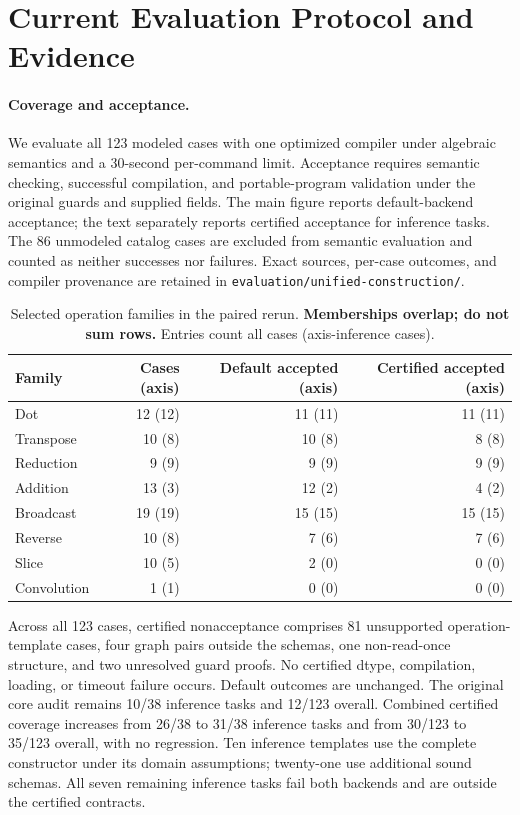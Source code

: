 \section{Current Evaluation Protocol and Evidence}
\label{app:current-evaluation}
\paragraph{Coverage and acceptance.}
We evaluate all 123 modeled cases with one optimized compiler under
algebraic semantics and a 30-second per-command limit. Acceptance requires
semantic checking, successful compilation, and portable-program validation
under the original guards and supplied fields. The main figure reports
default-backend acceptance; the text separately reports certified acceptance
for inference tasks. The 86 unmodeled catalog cases are excluded from
semantic evaluation and counted as neither successes nor failures.
Exact sources, per-case outcomes, and compiler provenance are retained in
\nolinkurl{evaluation/unified-construction/}.

\begin{table}[!htbp]
\caption{Selected operation families in the paired rerun.
\textbf{Memberships overlap; do not sum rows.} Entries count all cases (axis-inference cases).}
\label{tab:current-operation-families}
\small
\begin{tabularx}{\linewidth}{@{}Yrrr@{}}\toprule
Family & Cases (axis) & Default accepted (axis) & Certified accepted (axis)\\\midrule
Dot & 12 (12) & 11 (11) & 11 (11)\\
Transpose & 10 (8) & 10 (8) & 8 (8)\\
Reduction & 9 (9) & 9 (9) & 9 (9)\\
Addition & 13 (3) & 12 (2) & 4 (2)\\
Broadcast & 19 (19) & 15 (15) & 15 (15)\\
Reverse & 10 (8) & 7 (6) & 7 (6)\\
Slice & 10 (5) & 2 (0) & 0 (0)\\
Convolution & 1 (1) & 0 (0) & 0 (0)\\\bottomrule
\end{tabularx}
\end{table}
Across all 123 cases, certified nonacceptance comprises 81 unsupported
operation-template cases, four graph pairs outside the schemas, one
non-read-once structure, and two unresolved guard proofs. No certified
dtype, compilation, loading, or timeout failure occurs. Default outcomes
are unchanged. The original core audit remains 10/38 inference tasks and
12/123 overall. Combined certified coverage increases from 26/38 to 31/38
inference tasks and from 30/123 to 35/123 overall, with no regression.
Ten inference templates use the complete constructor under its domain
assumptions; twenty-one use additional sound schemas. All seven remaining
inference tasks fail both backends and are outside the certified contracts.

